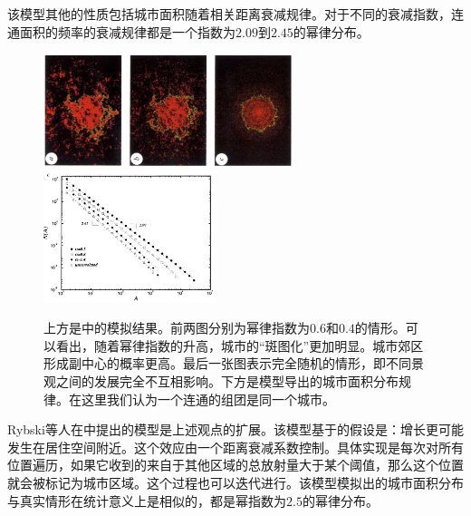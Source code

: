 该模型其他的性质包括城市面积随着相关距离衰减规律。对于不同的衰减指数，连通面积的频率的衰减规律都是一个指数为$2.09$到$2.45$的幂律分布。
\begin{figure}
    \centering
    \includegraphics[width = 0.65\textwidth]{pictures/modellingurbanpattern.png}
    \includegraphics[width = 0.45\textwidth]{pictures/area_scaling.png}
    \caption{上方是\cite{Makse1995}中的模拟结果。前两图分别为幂律指数为$0.6$和$0.4$的情形。可以看出，随着幂律指数的升高，城市的“斑图化”更加明显。城市郊区形成副中心的概率更高。最后一张图表示完全随机的情形，即不同景观之间的发展完全不互相影响。下方是\cite{Makse1995}模型导出的城市面积分布规律。在这里我们认为一个连通的组团是同一个城市。}
\end{figure}

Rybski等人在\cite{PhysRevE.87.042114}中提出的模型是上述观点的扩展。该模型基于的假设是：增长更可能发生在居住空间附近。这个效应由一个距离衰减系数控制。具体实现是每次对所有位置遍历，如果它收到的来自于其他区域的总放射量大于某个阈值，那么这个位置就会被标记为城市区域。这个过程也可以迭代进行。该模型模拟出的城市面积分布与真实情形在统计意义上是相似的，都是幂指数为$2.5$的幂律分布。

